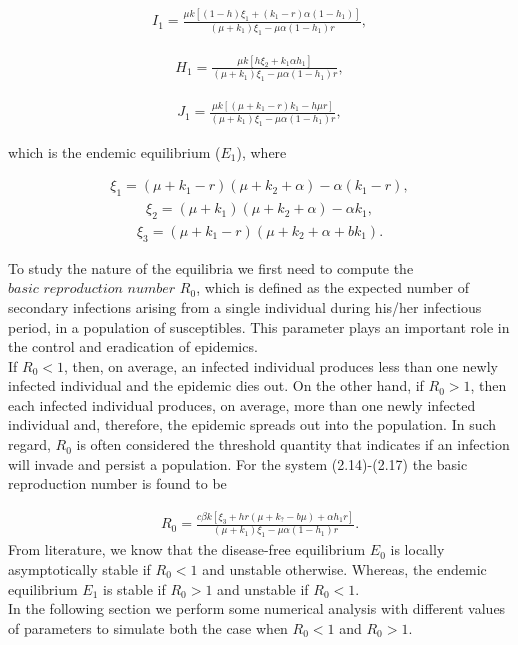 \begin{align}
I_{1} = \frac{\mu k [(1-h)\xi_{1} + (k_{1}-r)\alpha(1-h_{1})]}{(\mu+k_{1})\xi_{1} - \mu\alpha(1-h_{1})r},
\end{align}

\begin{align}
H_{1} = \frac{\mu k[h\xi_{2}+k_{1}\alpha h_{1}]}{(\mu+k_{1})\xi_{1} - \mu\alpha(1-h_{1})r},
\end{align}

\begin{align}
J_{1} = \frac{\mu k[(\mu+k_{1}-r)k_{1} - h\mu r]}{(\mu+k_{1})\xi_{1} - \mu\alpha(1-h_{1})r},
\end{align}

which is the endemic equilibrium ($E_{1}$), where

\begin{align*}
\xi_{1} = (\mu+k_{1}-r)(\mu + k_{2} +\alpha) - \alpha(k_{1}-r),
\end{align*}
\begin{align*}
\xi_{2} = (\mu+k_{1})(\mu+k_{2}+\alpha)-\alpha k_{1},
\end{align*}
\begin{align*}
\xi_{3} = (\mu+k_{1}-r)(\mu+k_{2}+\alpha+bk_{1}).
\end{align*}

To study the nature of the equilibria we first need to compute the $\textit{basic reproduction number}$ $R_{0}$, which is defined as the expected number of secondary infections arising from a single individual during his/her infectious period, in a population of susceptibles. This parameter plays an important role in the control and eradication of epidemics. \\
If $R_{0}<1$, then, on average, an infected individual produces less than one newly infected individual and the epidemic dies out. On the other hand, if $R_{0} >1$, then each infected individual produces, on average, more than one newly infected individual and, therefore, the epidemic spreads out into the population. In such regard, $R_{0}$ is often considered the threshold quantity that indicates if an infection will invade and persist a population. 
For the system (2.14)-(2.17) the basic reproduction number is found to be

\begin{align}
R_{0} = \frac{c\beta k[\xi_{3}+hr(\mu+k_{?}-b\mu)+\alpha h_{1}r]}{(\mu+k_{1})\xi_{1} -\mu\alpha(1-h_{1})r}.
\end{align}
From literature, we know that the disease-free equilibrium $E_{0}$ is locally asymptotically stable if $R_{0} < 1$ and unstable otherwise. Whereas, the endemic equilibrium $E_{1}$ is stable if $R_{0} > 1$ and unstable if $R_{0} < 1$.\\
In the following section we perform some numerical analysis with different values of parameters to simulate both the case when $R_{0} < 1$ and $R_{0}>1$.

